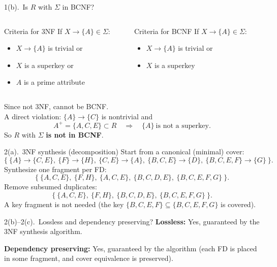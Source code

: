 \documentclass[UTF8]{beamer}
\begin{document}
\begin{frame}{1(b).\ Is $R$ with $\Sigma$ in BCNF?}
\footnotesize
\begin{columns}
    \begin{column}{0.5\textwidth}
        \begin{block}{Criteria for 3NF}
    If $X\to \{A\} \in \Sigma$:
    \begin{itemize}
        \item $X\to \{A\}$ is trivial \alert{or}
        \item $X$ is a superkey \alert{or}
        \item $A$ is a prime attribute
    \end{itemize}
\end{block}
    \end{column}
    \begin{column}{0.5\textwidth}
        \begin{block}{Criteria for BCNF}
    If $X\to \{A\} \in \Sigma$:
    \begin{itemize}
        \item $X\to \{A\}$ is trivial \alert{or}
        \item $X$ is a superkey
    \end{itemize}
\end{block}
    \end{column}
\end{columns}
\vspace{0.5cm}
Since not 3NF, cannot be BCNF.\\
A direct violation: $\{A\}\to\{C\}$ is nontrivial and
\[
A^+=\{A,C,E\}\subset R\quad\Rightarrow\quad \{A\}\ \text{is not a superkey}.
\]
So $R$ with $\Sigma$ \textbf{is not in BCNF}.
\end{frame}

\begin{frame}{2(a).\ 3NF synthesis (decomposition)}
\footnotesize
Start from a canonical (minimal) cover:
\[
\{\ \{A\} \to \{C,E\},\ \{F\} \to \{H\},\ \{C,E\} \to \{A\},\ \{B,C,E\} \to \{D\},\ \{B,C,E,F\} \to \{G\}\ \}.
\]
Synthesize one fragment per FD:
\[
\{\ \{A,C,E\},\ \{F,H\},\ \{A,C,E\},\ \{B,C,D,E\},\ \{B,C,E,F,G\}\ \}.
\]
Remove subsumed duplicates:
\[
\{\ \{A,C,E\},\ \{F,H\},\ \{B,C,D,E\},\ \{B,C,E,F,G\}\ \}.
\]
A key fragment is not needed (the key $\{B,C,E,F\}\subseteq \{B,C,E,F,G\}$ is covered).
\end{frame}

\begin{frame}{2(b)--2(c).\ Lossless and dependency preserving?}
\small
\textbf{Lossless:} Yes, guaranteed by the 3NF synthesis algorithm.\medskip

\textbf{Dependency preserving:} Yes, guaranteed by the algorithm (each FD is placed in some fragment, and cover equivalence is preserved).
\end{frame}
\end{document}
